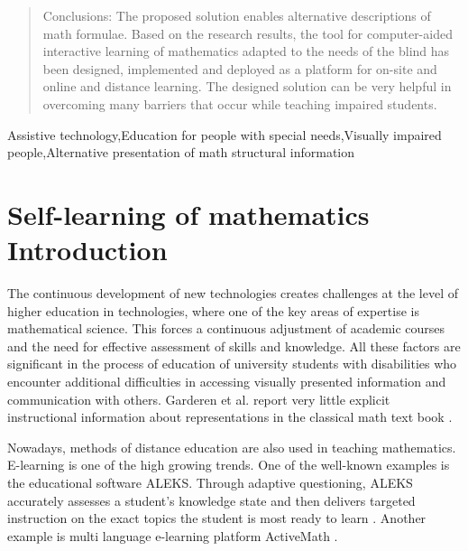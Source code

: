 \documentclass[12pt,1p]{elsarticle}
\begin{document}
\begin{frontmatter}
\begin{abstract}
	Conclusions: The proposed solution enables alternative
descriptions of math formulae. Based on the research results, the
tool for computer-aided interactive learning of mathematics
adapted to the needs of the blind has been designed, implemented
and deployed as a platform for on-site and online and distance
learning. The designed solution can be very helpful in
overcoming many barriers that occur while teaching impaired
students.
	\end{abstract}
	
	\begin{keyword}
		Assistive technology\sep Education for people with special needs\sep Visually impaired people\sep Alternative presentation of math structural information
		
		
	\end{keyword}
	
\end{frontmatter}




\section{Self-learning of mathematics Introduction}
	The continuous development of new technologies creates challenges at the level of higher education in technologies, where one of the key areas of expertise is mathematical science. This forces a continuous adjustment of academic courses and the need for effective assessment of skills and knowledge. All these factors are significant in the process of education of university students with disabilities who encounter additional difficulties in accessing visually presented information and communication with others. Garderen et al. report very little explicit instructional information about representations in the classical math text book \cite{Garderen:2012}.
	
	Nowadays, methods of distance education are also used in teaching mathematics. E-learning is one of the high growing trends. One of the well-known examples is the educational software ALEKS. Through adaptive questioning, ALEKS accurately assesses a student's knowledge state and then delivers targeted instruction on the exact topics the student is most ready to learn \cite{Craiga:2013}. Another example is multi language e-learning platform ActiveMath \cite{Goguadze:2005}.
\end{document}
